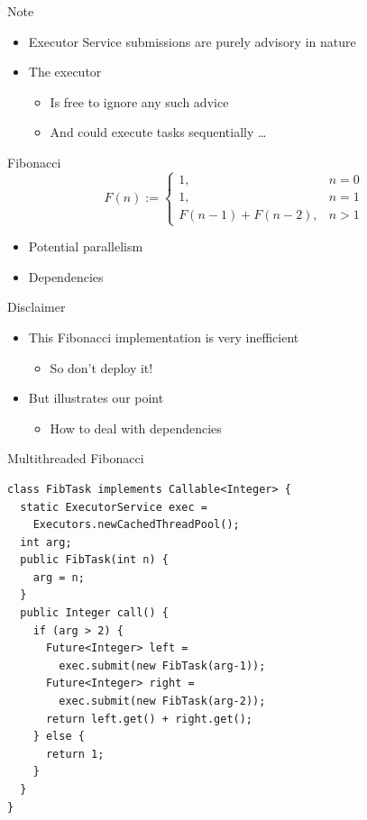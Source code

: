 \begin{frame}{Note}
  \begin{itemize}
  \item Executor Service submissions are purely advisory in nature
  \item The executor
    \begin{itemize}
    \item Is free to ignore any such advice
    \item And could execute tasks sequentially \ldots
    \end{itemize}
  \end{itemize}
\end{frame}

\begin{frame}{Fibonacci}
  \large{
    \begin{equation*}
      F(n) := 
      \begin{cases}
        1, & n = 0 \\
        1, & n = 1 \\
        F(n-1) + F(n-2), & n > 1
      \end{cases}
    \end{equation*}
  }


  \begin{itemize}
  \item Potential parallelism
  \item Dependencies
  \end{itemize}
\end{frame}

\begin{frame}{Disclaimer}  
  \begin{itemize}
  \item This Fibonacci implementation is very inefficient
    \begin{itemize}
    \item So don’t deploy it!
    \end{itemize}
  \item But illustrates our point
    \begin{itemize}
    \item How to deal with dependencies  
    \end{itemize}
  \end{itemize}
\end{frame}

\begin{frame}[fragile]{Multithreaded Fibonacci}
\begin{lstlisting}[basicstyle=\fontsize{9}{11}\selectfont\ttfamily]
class FibTask implements Callable<Integer> {
  static ExecutorService exec = 
    Executors.newCachedThreadPool();
  int arg;
  public FibTask(int n) {
    arg = n;
  }
  public Integer call() {
    if (arg > 2) {
      Future<Integer> left = 
        exec.submit(new FibTask(arg-1));
      Future<Integer> right = 
        exec.submit(new FibTask(arg-2));
      return left.get() + right.get();
    } else {
      return 1;
    }
  }
}
\end{lstlisting}
\end{frame}



